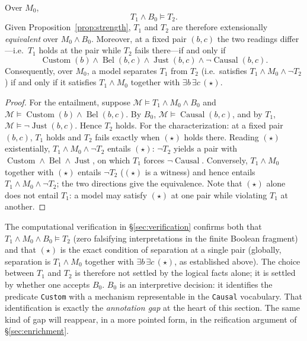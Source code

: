 \begin{proposition}
\label{prop:bridge-collapse}
Over $M_0$,
\[
T_1\land B_0 \models T_2.
\]
Given Proposition~\ref{prop:strength}, $T_1$ and $T_2$ are therefore
extensionally \emph{equivalent} over $M_0\land B_0$. Moreover, at a
fixed pair $(b,c)$ the two readings differ---i.e.\ $T_1$ holds at the
pair while $T_2$ fails there---if and only if
\[
\operatorname{Custom}(b)\land
\operatorname{Bel}(b,c)\land
\operatorname{Just}(b,c)\land
\neg\operatorname{Causal}(b,c).
\tag{$\star$}
\]
Consequently, over $M_0$, a model separates $T_1$ from $T_2$ (i.e.\
satisfies $T_1\land M_0\land\neg T_2$) if and only if it satisfies
$T_1\land M_0$ together with $\exists b\,\exists c\,(\star)$.
\end{proposition}

\begin{proof}
For the entailment, suppose $\mathcal M\models T_1\land M_0\land B_0$
and $\mathcal M\models\operatorname{Custom}(b)\land\operatorname{Bel}(b,c)$.
By $B_0$, $\mathcal M\models\operatorname{Causal}(b,c)$, and by $T_1$,
$\mathcal M\models\neg\operatorname{Just}(b,c)$. Hence $T_2$ holds.
For the characterization: at a fixed pair $(b,c)$, $T_1$ holds and
$T_2$ fails exactly when $(\star)$ holds there. Reading $(\star)$
existentially, $T_1\land M_0\land\neg T_2$ entails $(\star)$:
$\neg T_2$ yields a pair with $\operatorname{Custom}\land
\operatorname{Bel}\land\operatorname{Just}$, on which $T_1$ forces
$\neg\operatorname{Causal}$. Conversely, $T_1\land M_0$ together with
$(\star)$ entails $\neg T_2$ ($(\star)$ is a witness) and hence entails
$T_1\land M_0\land\neg T_2$; the two directions give the equivalence.
Note that $(\star)$ alone does not entail $T_1$: a model may satisfy
$(\star)$ at one pair while violating $T_1$ at another.
\end{proof}

The computational verification in \S\ref{sec:verification} confirms
both that $T_1\land M_0\land B_0\models T_2$ (zero falsifying
interpretations in the finite Boolean fragment) and that $(\star)$ is
the exact condition of separation at a single pair (globally,
separation is $T_1\land M_0$ together with $\exists b\,\exists c\,
(\star)$, as established above). The choice between $T_1$ and $T_2$
is therefore not settled by the logical facts alone; it is settled
by whether one accepts $B_0$. $B_0$ is an interpretive decision: it
identifies the predicate \texttt{Custom} with a mechanism
representable in the \texttt{Causal} vocabulary. That identification
is exactly the \emph{annotation gap} at the heart of this section.
The same kind of gap will reappear, in a more pointed form, in the
reification argument of \S\ref{sec:enrichment}.

